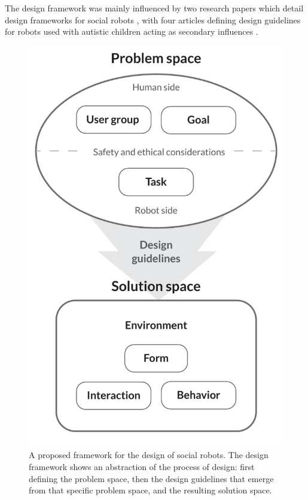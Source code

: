 The design framework was mainly influenced by two research papers which detail design frameworks for social robots \cite{bartneck2004design, huijnen2017implement}, with four articles defining design guidelines for robots used with autistic children acting as secondary influences \cite{designSpaces, giullian2010detailed, michaud2003characteristics, robins2007eliciting}.

\begin{figure}
\centering
  \includegraphics[scale=0.65]{images/designframework_v3.pdf}
  \caption{A proposed framework for the design of social robots. The design framework shows an abstraction of the process of design: first defining the problem space, then the design guidelines that emerge from that specific problem space, and the resulting solution space.}
  \label{fig:designframework}
\end{figure}

